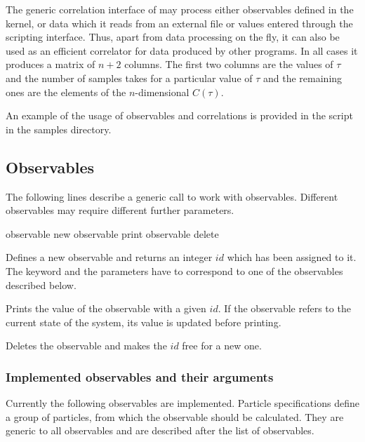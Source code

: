 The generic correlation interface of \es may process either observables
defined in the kernel, or data which it reads from an external file
or values entered through the scripting interface. 
Thus, apart from
data processing on the fly, it can also be used as an efficient correlator
for data produced by other programs. In all cases it produces a matrix of 
$n+2$ columns. The first two columns are the values of $\tau$ and 
the number of samples takes for a particular value of $\tau$ and the
remaining ones are the elements of the $n$-dimensional $C(\tau)$.


An example of the usage of observables and correlations is provided 
in the script  in the samples directory.

\subsection{Observables}
\label{ssec:observable}

The following lines describe a generic call to work with 
observables. Different observables may require different further parameters.
\begin{essyntax}
   observable new  
   observable  print 
   observable  delete
\end{essyntax}
  
Defines a new observable and returns an integer $id$ which has been assigned to it.
The keyword  and the parameters have to correspond to one of the
observables described below.

 Prints the value of the observable with a given $id$. If the observable
refers to the current state of the system, its value is updated before printing.

 Deletes the observable and makes the $id$ free for a new one.

\subsubsection{Implemented observables and their arguments}
Currently the following observables are implemented.
Particle specifications define a group of particles, from which
the observable should be calculated. They are generic to all 
observables and are described after the list of observables.

